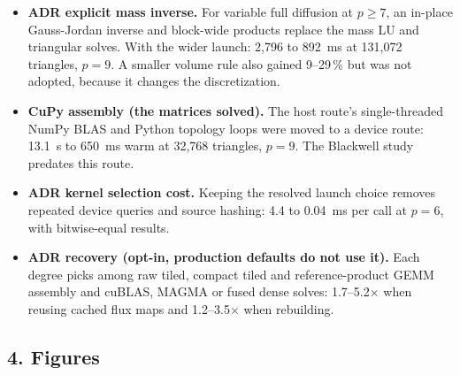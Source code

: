 \documentclass[10pt,a4paper]{article}
\begin{document}
\begin{itemize}
  block-size table from earlier sweeps (32, 64, then 128 threads from $p=5$) became 32 at $p\le4$
  and, for variable coefficients, 256 at $p=8$ and 512 with a non-compact layout and a 128-register
  cap at $p=9$. One block fits per SM there, so at $p=9$ each doubling of threads gains
  1.7--1.9$\times$ up to 256, and only 7\,\% more at 512. The H200's 227~KiB of shared memory also keeps the mass factor in shared memory, where the Blackwell's
  99~KiB forces an external layout at $p\ge7$.
\item \textbf{ADR explicit mass inverse.} For variable full diffusion at $p\ge7$, an in-place
  Gauss-Jordan inverse and block-wide products replace the mass LU and triangular solves. With the
  wider launch: 2{,}796 to 892~ms at 131{,}072 triangles, $p=9$. A smaller volume rule also gained
  9--29\,\% but was not adopted, because it changes the discretization.
\item \textbf{CuPy assembly (the matrices solved).} The host route's single-threaded NumPy BLAS and
  Python topology loops were moved to a device route: 13.1~s to 650~ms warm at 32{,}768 triangles,
  $p=9$. The Blackwell study predates this route.
\item \textbf{ADR kernel selection cost.} Keeping the resolved launch choice removes repeated device
  queries and source hashing: 4.4 to 0.04~ms per call at $p=6$, with bitwise-equal results.
\item \textbf{ADR recovery (opt-in, production defaults do not use it).} Each degree picks among raw
  tiled, compact tiled and reference-product GEMM assembly and cuBLAS, MAGMA or fused dense solves:
  1.7--5.2$\times$ when reusing cached flux maps and 1.2--3.5$\times$ when rebuilding.
\end{itemize}

\subsection*{4. Figures}
\end{document}

